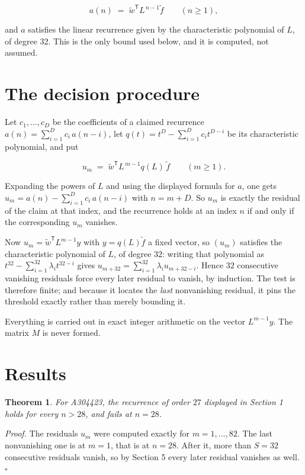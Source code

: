 \documentclass[11pt]{article}
\newtheorem{theorem}{Theorem}
\theoremstyle{definition}
\begin{document}
\[a(n) \;=\; \tilde w^{\mathsf T} L^{\,n-1} \tilde f \qquad (n \ge 1),\]

and $a$ satisfies the linear recurrence given by the characteristic polynomial of $L$, of degree $32$. This is the only bound used below, and it is computed, not assumed.

\section{The decision procedure}

Let $c_1,\dots,c_D$ be the coefficients of a claimed recurrence $a(n) = \sum_{i=1}^{D} c_i\,a(n-i)$, let $q(t) = t^{D} - \sum_{i=1}^{D} c_i t^{D-i}$ be its characteristic polynomial, and put

\[u_m \;=\; \tilde w^{\mathsf T} L^{\,m-1} q(L)\,\tilde f \qquad (m \ge 1).\]

Expanding the powers of $L$ and using the displayed formula for $a$, one gets $u_m = a(n) - \sum_{i=1}^{D} c_i\,a(n-i)$ with $n = m + D$. So $u_m$ is exactly the residual of the claim at that index, and the recurrence holds at an index $n$ if and only if the corresponding $u_m$ vanishes.

Now $u_m = \tilde w^{\mathsf T} L^{m-1} y$ with $y = q(L)\tilde f$ a fixed vector, so $(u_m)$ satisfies the characteristic polynomial of $L$, of degree $32$: writing that polynomial as $t^{32} - \sum_{i=1}^{32} \lambda_i t^{32-i}$ gives $u_{m+32} = \sum_{i=1}^{32} \lambda_i u_{m+32-i}$. Hence $32$ consecutive vanishing residuals force every later residual to vanish, by induction. The test is therefore finite; and because it locates the {\itshape last} nonvanishing residual, it pins the threshold exactly rather than merely bounding it.

Everything is carried out in exact integer arithmetic on the vector $L^{m-1}y$. The matrix $M$ is never formed.

\section{Results}

\begin{theorem} For A304423, the recurrence of order $27$ displayed in Section 1 holds for every $n > 28$, and fails at $n = 28$.\end{theorem}

{\itshape Proof.} The residuals $u_m$ were computed exactly for $m = 1,\dots,82$. The last nonvanishing one is at $m = 1$, that is at $n = 28$. After it, more than $S = 32$ consecutive residuals vanish, so by Section 5 every later residual vanishes as well. $\square$
\end{document}
